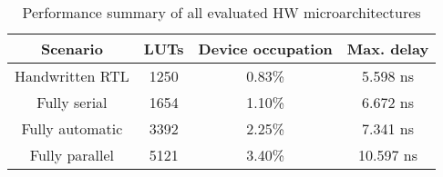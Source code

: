 \begin{table}[h]
    \begin{center}
        \begin{tabular}{cccc}
            \toprule
            \textbf{Scenario} & \textbf{LUTs} & \textbf{Device occupation} & \textbf{Max. delay}
            \tabularnewline
            \midrule
            Handwritten RTL  & 1250  & 0.83\%   &  5.598 ns
            \tabularnewline
            Fully serial     & 1654  & 1.10\%   &  6.672 ns
            \tabularnewline
            Fully automatic  & 3392  & 2.25\%   &  7.341 ns
            \tabularnewline
            Fully parallel   & 5121  & 3.40\%   &  10.597 ns
            \tabularnewline
            \bottomrule
        \end{tabular}
    \end{center}
    \caption{Performance summary of all evaluated HW microarchitectures}
    \label{tab:results-hw}
\end{table}
